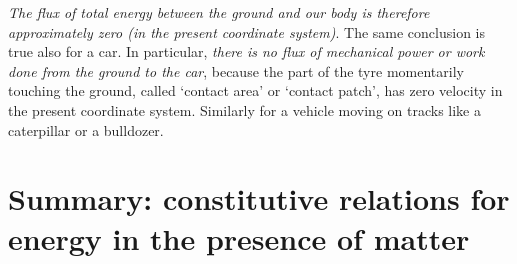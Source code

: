 \documentclass[a4paper,12pt,%
onecolumn,oneside,%
british%
]{memoir}
\renewcommand*{\|}[1][]{\nonscript\:#1\vert\nonscript\:\mathopen{}}
\begin{document}
%
%
\emph{The flux of total energy between the ground and our body is therefore approximately zero (in the present coordinate system)}. The same conclusion is true also for a car. In particular, \emph{there is no flux of mechanical power or work done from the ground to the car}, because the part of the tyre momentarily touching the ground, called \enquote*{contact area} or \enquote*{contact patch}, has zero velocity in the present coordinate system. Similarly for a vehicle moving on tracks like a caterpillar or a bulldozer.



\section{Summary: constitutive relations for energy in the presence of matter}
\label{sec:summary_newton_energy}
\end{document}
